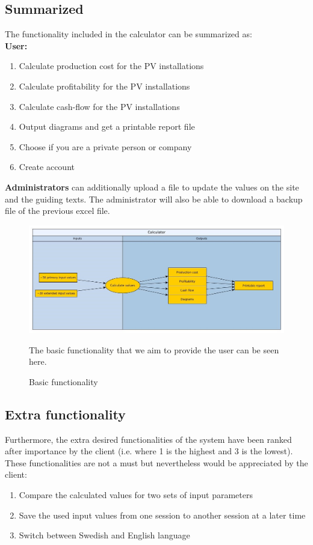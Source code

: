 \documentclass[]{article}
\begin{document}
\subsection{Summarized}
The functionality included in the calculator can be summarized as:\\
\textbf{User:}
\begin{enumerate}
	\item Calculate production cost for the PV installations
	\item Calculate profitability for the PV installations
	\item Calculate cash-flow for the PV installations
	\item Output diagrams and get a printable report file
	\item Choose if you are a private person or company
	\item Create account
\end{enumerate}
\textbf{Administrators} can additionally upload a file to update the values on the site and the guiding texts. The administrator will also be able to download a backup file of the previous excel file.

\begin{figure}[H]
	\includegraphics[width=1.0\linewidth]{Bild1}
	\caption{Basic functionality}
	\medskip
	\small
	The basic functionality that we aim to provide the user can be seen here.
	\label{fig:Bild1}
\end{figure}

\subsection{Extra functionality}
Furthermore, the extra desired functionalities of the system have been ranked after importance by the client (i.e. where 1 is the highest and 3 is the lowest). These functionalities are not a must but nevertheless would be appreciated by the client: 

\begin{enumerate}
	\item Compare the calculated values for two sets of input parameters
	\item Save the used input values from one session to another session at a later time
	\item Switch between Swedish and English language
\end{enumerate}
\end{document}
